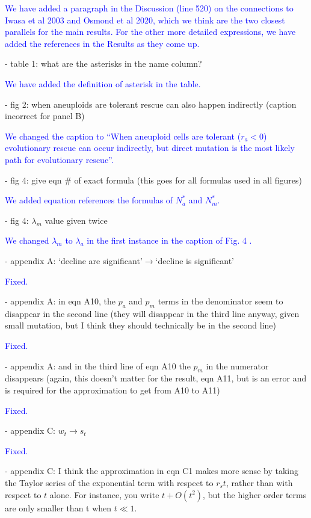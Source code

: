 \documentclass[12pt]{extarticle}
\renewcommand{\Delta}{r}
\begin{document}
\textcolor{blue}{We have added a paragraph in the Discussion (line 520) on the connections to Iwasa et al 2003 and Osmond et al 2020, which we think are the two closest parallels for the main results. 
For the other more detailed expressions, we have added the references in the Results as they come up.} 

- table 1: what are the asterisks in the name column?

\textcolor{blue}{%
We have added the definition of asterisk in the table.
} 

- fig 2: when aneuploids are tolerant rescue can also happen indirectly (caption incorrect for panel B)

\textcolor{blue}{%
We changed the caption to ``When aneuploid cells are tolerant ($\Delta_a<0$) evolutionary rescue can occur indirectly, but direct mutation is the most likely path for evolutionary rescue''.
} 

- fig 4: give eqn $\#$ of exact formula (this goes for all formulas used in all figures)

\textcolor{blue}{%
We added equation references the formulas of $N_a^*$ and $N_m^*$.
} 

- fig 4: $\lambda_m$ value given twice

\textcolor{blue}{%
We changed $\lambda_m$ to $\lambda_a$ in the first instance in the caption of Fig. 4 .
} 

- appendix A: `decline are significant'$\rightarrow$`decline is significant'

\textcolor{blue}{Fixed.}  %

- appendix A: in eqn A10, the $p_a$ and $p_m$ terms in the denominator seem to disappear in the second line (they will disappear in the third line anyway, given small mutation, but I think they should technically be in the second line)

\textcolor{blue}{Fixed.} %

- appendix A: and in the third line of eqn A10 the $p_m$ in the numerator disappears (again, this doesn't matter for the result, eqn A11, but is an error and is required for the approximation to get from A10 to A11)

\textcolor{blue}{Fixed.} %

- appendix C: $w_t\rightarrow s_t$

\textcolor{blue}{Fixed.} %

- appendix C: I think the approximation in eqn C1 makes more sense by taking the Taylor series of the exponential term with respect to $\Delta_st$, rather than with respect to $t$ alone. For instance, you write $t + O(t^2)$, but the higher order terms are only smaller than t when $t\ll1$.
\end{document}
